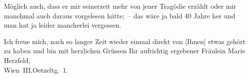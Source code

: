 \pstart
           Möglich auch, dass er mir seinerzeit mehr von jener Tragödie erzählt oder mir manchmal auch daraus vorgelesen
               hätte; – das wäre ja bald 40 Jahre her und man hat ja leider mancherlei
               vergessen.\pend
           
\pstart
           Ich freue mich, nach so langer Zeit wieder einmal direkt von
                  {[}Ihnen{]} etwas gehört zu haben und bin mit herzlichen
               Grüssen\pend
           \pstart Ihr aufrichtig ergebener\pend{}{\vspace{1\baselineskip}}
\pstart
           \noindent{}Fräulein Marie Herzfeld,{\\}Wien III.Oetzeltg. 1.\pend
           \endnumbering{}  
      